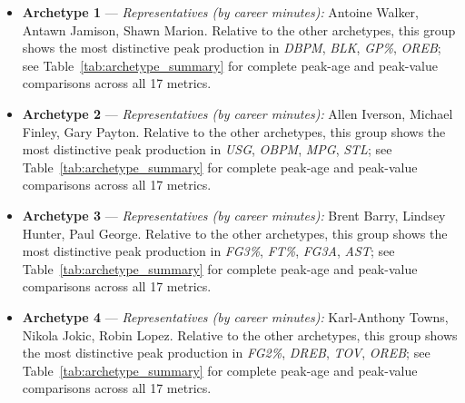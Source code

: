 \begin{itemize}
\item \textbf{Archetype 1} --- \emph{Representatives (by career minutes):} Antoine Walker, Antawn Jamison, Shawn Marion. Relative to the other archetypes, this group shows the most distinctive peak production in \textit{DBPM}, \textit{BLK}, \textit{GP\%}, \textit{OREB}; see Table~\ref{tab:archetype_summary} for complete peak-age and peak-value comparisons across all 17 metrics.
\item \textbf{Archetype 2} --- \emph{Representatives (by career minutes):} Allen Iverson, Michael Finley, Gary Payton. Relative to the other archetypes, this group shows the most distinctive peak production in \textit{USG}, \textit{OBPM}, \textit{MPG}, \textit{STL}; see Table~\ref{tab:archetype_summary} for complete peak-age and peak-value comparisons across all 17 metrics.
\item \textbf{Archetype 3} --- \emph{Representatives (by career minutes):} Brent Barry, Lindsey Hunter, Paul George. Relative to the other archetypes, this group shows the most distinctive peak production in \textit{FG3\%}, \textit{FT\%}, \textit{FG3A}, \textit{AST}; see Table~\ref{tab:archetype_summary} for complete peak-age and peak-value comparisons across all 17 metrics.
\item \textbf{Archetype 4} --- \emph{Representatives (by career minutes):} Karl-Anthony Towns, Nikola Jokic, Robin Lopez. Relative to the other archetypes, this group shows the most distinctive peak production in \textit{FG2\%}, \textit{DREB}, \textit{TOV}, \textit{OREB}; see Table~\ref{tab:archetype_summary} for complete peak-age and peak-value comparisons across all 17 metrics.
\end{itemize}
